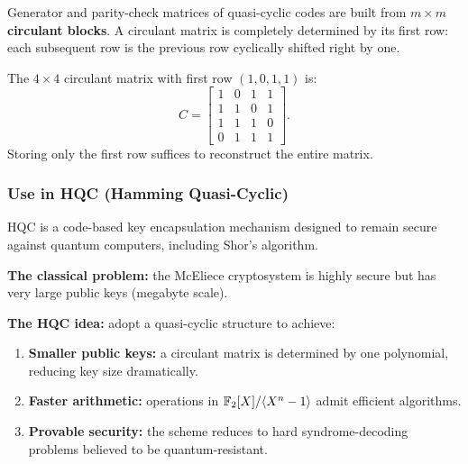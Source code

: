 Generator and parity-check matrices of quasi-cyclic codes are built from \(m\times m\) \textbf{circulant blocks}. A circulant matrix is completely determined by its first row: each subsequent row is the previous row cyclically shifted right by one.

\begin{example}
The \(4\times 4\) circulant matrix with first row \((1,0,1,1)\) is:
\[C = \begin{bmatrix}
1 & 0 & 1 & 1 \\
1 & 1 & 0 & 1 \\
1 & 1 & 1 & 0 \\
0 & 1 & 1 & 1
\end{bmatrix}.\]
Storing only the first row suffices to reconstruct the entire matrix.
\end{example}

\subsubsection*{Use in HQC (Hamming Quasi-Cyclic)}

HQC is a code-based key encapsulation mechanism designed to remain secure against quantum computers, including Shor's algorithm.

\textbf{The classical problem:} the McEliece cryptosystem is highly secure but has very large public keys (megabyte scale).

\textbf{The HQC idea:} adopt a quasi-cyclic structure to achieve:
\begin{enumerate}[(1)]
	\item \textbf{Smaller public keys:} a circulant matrix is determined by one polynomial, reducing key size dramatically.
	\item \textbf{Faster arithmetic:} operations in \(\mathbb{F}_2[X]/\langle X^n-1\rangle\) admit efficient algorithms.
	\item \textbf{Provable security:} the scheme reduces to hard syndrome-decoding problems believed to be quantum-resistant.
\end{enumerate}